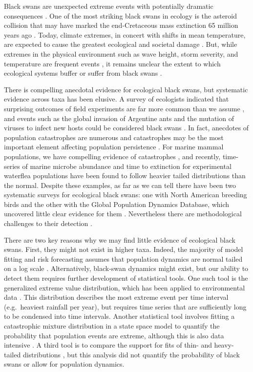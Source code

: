 Black swans are unexpected extreme events with potentially dramatic
consequences \citep{taleb2007,sornette2009}. One of the most striking black
swans in ecology is the asteroid collision that may have marked the
end-Cretaceous mass extinction 65 million years ago
\citep{alvarez1980,harnik2012}. Today, climate extremes, in concert with
shifts in mean temperature, are expected to cause the greatest ecological and
societal damage \citep{ipcc2012}. But, while extremes in the physical
environment such as wave height, storm severity, and temperature are frequent
events \citep{gaines1993,katz2005}, it remains unclear the extent to which
ecological systems buffer or suffer from black swans \citep{nunez2012}.

There is compelling anecdotal evidence for ecological black swans, but
systematic evidence across taxa has been elusive. A survey of ecologists
indicated that surprising outcomes of field experiments are far more common
than we assume \citep{doak2008}, and events such as the global invasion of
Argentine ants and the mutation of viruses to infect new hosts could be
considered black swans \citep{nunez2012}. In fact, anecdotes of population
catastrophes are numerous and catastrophes may be the most important element
affecting population persistence \citep{mangel1994}. For marine mammal
populations, we have compelling evidence of catastrophes \citep{gerber2001,
  ward2007}, and recently, time-series of marine microbe abundance
\citep{segura2013} and time to extinction for experimental waterflea
populations \citep{drake2014} have been found to follow heavier tailed
distributions than the normal. Despite these examples, as far as we can tell
there have been two systematic surveys for ecological black swans: one with
North American breeding birds and the other with the Global Population
Dynamics Database, which uncovered little clear evidence for them
\citep{keitt1998,allen2001,halley2002}. Nevertheless there are methodological
challenges to their detection \citep{allen2001,ward2007}.

There are two key reasons why we may find little evidence of ecological black
swans. First, they might not exist in higher taxa. Indeed, the majority of
model fitting and risk forecasting assumes that population dynamics are normal
tailed on a log scale \citep[e.g.][]{brook2006a,dennis2006,knape2012}.
Alternatively, black-swan dynamics might exist, but our ability to detect
them requires further development of statistical tools. One such tool is the
generalized extreme value distribution, which has been applied to
environmental data \citep[e.g.][]{katz2005}. This distribution describes the
most extreme event per time interval (e.g.~heaviest rainfall per year), but
requires time series that are sufficiently long to be condensed into time
intervals. Another statistical tool involves fitting a catastrophic mixture
distribution in a state space model to quantify the probability that
population events are extreme, although this is also data intensive
\citep{ward2007}. A third tool is to compare the support for fits of thin- and
heavy-tailed distributions \citep{halley2002}, but this analysis did not
quantify the probability of black swans or allow for population dynamics.


